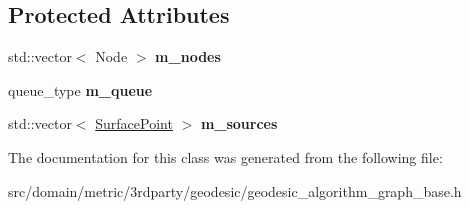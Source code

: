 \subsection*{Protected Attributes}
\begin{DoxyCompactItemize}
\item 
\hypertarget{classgeodesic_1_1_geodesic_algorithm_graph_base_a33b2fc3faa40d7fa2df9873803274013}{}std\+::vector$<$ Node $>$ {\bfseries m\+\_\+nodes}\label{classgeodesic_1_1_geodesic_algorithm_graph_base_a33b2fc3faa40d7fa2df9873803274013}

\item 
\hypertarget{classgeodesic_1_1_geodesic_algorithm_graph_base_a295cc419900e077f47719064690dac5d}{}queue\+\_\+type {\bfseries m\+\_\+queue}\label{classgeodesic_1_1_geodesic_algorithm_graph_base_a295cc419900e077f47719064690dac5d}

\item 
\hypertarget{classgeodesic_1_1_geodesic_algorithm_graph_base_aa48d0a59f9f4983571adb39813a337ae}{}std\+::vector$<$ \hyperlink{classgeodesic_1_1_surface_point}{Surface\+Point} $>$ {\bfseries m\+\_\+sources}\label{classgeodesic_1_1_geodesic_algorithm_graph_base_aa48d0a59f9f4983571adb39813a337ae}

\end{DoxyCompactItemize}


The documentation for this class was generated from the following file\+:\begin{DoxyCompactItemize}
\item 
src/domain/metric/3rdparty/geodesic/geodesic\+\_\+algorithm\+\_\+graph\+\_\+base.\+h\end{DoxyCompactItemize}

